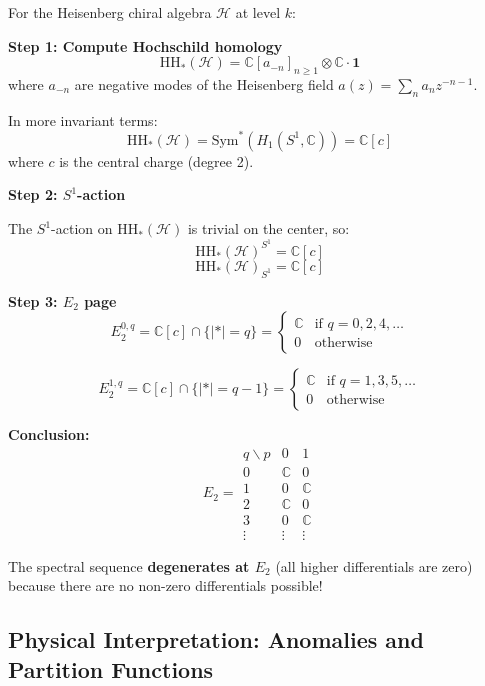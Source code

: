 \begin{example}
\label{ex:E2-heisenberg}
For the Heisenberg chiral algebra $\mathcal{H}$ at level $k$:

\textbf{Step 1: Compute Hochschild homology}
$$\text{HH}_*(\mathcal{H}) = \mathbb{C}[a_{-n}]_{n \geq 1} \otimes \mathbb{C} \cdot \mathbf{1}$$
where $a_{-n}$ are negative modes of the Heisenberg field $a(z) = \sum_n a_n z^{-n-1}$.

In more invariant terms:
$$\text{HH}_*(\mathcal{H}) = \text{Sym}^*(H_1(S^1, \mathbb{C})) = \mathbb{C}[c]$$
where $c$ is the central charge (degree 2).

\textbf{Step 2: $S^1$-action}

The $S^1$-action on $\text{HH}_*(\mathcal{H})$ is trivial on the center, so:
$$\text{HH}_*(\mathcal{H})^{S^1} = \mathbb{C}[c]$$
$$\text{HH}_*(\mathcal{H})_{S^1} = \mathbb{C}[c]$$

\textbf{Step 3: $E_2$ page}
$$E_2^{0,q} = \mathbb{C}[c] \cap \{|*| = q\} = \begin{cases}
\mathbb{C} & \text{if } q = 0, 2, 4, \ldots \\
0 & \text{otherwise}
\end{cases}$$

$$E_2^{1,q} = \mathbb{C}[c] \cap \{|*| = q-1\} = \begin{cases}
\mathbb{C} & \text{if } q = 1, 3, 5, \ldots \\
0 & \text{otherwise}
\end{cases}$$

\textbf{Conclusion:}
$$E_2 = \begin{array}{c|cc}
q \backslash p & 0 & 1 \\
\hline
0 & \mathbb{C} & 0 \\
1 & 0 & \mathbb{C} \\
2 & \mathbb{C} & 0 \\
3 & 0 & \mathbb{C} \\
\vdots & \vdots & \vdots
\end{array}$$

The spectral sequence \textbf{degenerates at $E_2$} (all higher differentials are zero) 
because there are no non-zero differentials possible!
\end{example}

\subsection{Physical Interpretation: Anomalies and Partition Functions}

